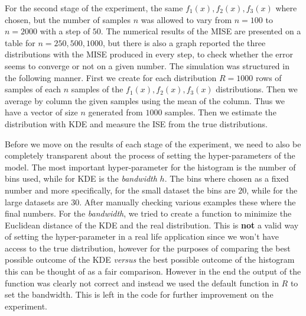 \documentclass[fleqn, a4paper]{report}
\begin{document}
For the second stage of the experiment, the same $f_1(x), f_2(x), f_3(x)$ where chosen, but the number of samples $n$ was allowed to vary from $n=100$ to $n=2000$ with a step of $50$. The numerical results of the MISE are presented on a table for $n=250,500,1000$, but there is also a graph reported the three distributions with the MISE produced in every step, to check whether the error seems to converge or not on a given number. The simulation was structured in the following manner. First we create for each distribution $R=1000$ rows of samples of each $n$ samples of the $f_1(x), f_2(x), f_3(x)$ distributions. Then we average by column the given samples using the mean of the column. Thus we have a vector of size $n$ generated from $1000$ samples. Then we estimate the distribution with KDE and measure the ISE from the true distributions. 

Before we move on the results of each stage of the experiment, we need to also be completely transparent about the process of setting the hyper-parameters of the model. The most important hyper-parameter for the histogram is the number of bins used, while for KDE is the \textit{bandwidth} $h$. The bins where chosen as a fixed number and more specifically, for the small dataset the bins are $20$, while for the large datasets are $30$. After manually checking various examples these where the final numbers. For the \textit{bandwidth}, we tried to create a function to minimize the Euclidean distance of the KDE and the real distribution. This is \textbf{not} a valid way of setting the hyper-parameter in a real life application since we won't have access to the true distribution, however for the purposes of comparing the best possible outcome of the KDE \textit{versus} the best possible outcome of the histogram this can be thought of as a fair comparison. However in the end the output of the function was clearly not correct and instead we used the default function in $R$ to set the bandwidth. This is left in the code for further improvement on the experiment. 
\end{document}
